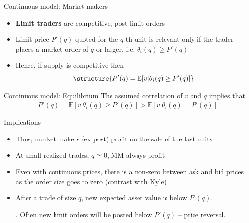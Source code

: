\documentclass[english,10pt
,aspectratio=169
]{beamer}
\begin{document}
\begin{frame}{Continuous model: Market makers}
	\begin{itemize}	
		\item \textbf{Limit traders} are competitive, post limit orders
		\item Limit price $P'(q)$ quoted for the $q$-th unit is relevant only if the trader places a market order of $q$ or larger, i.e. $\theta_i(q) \geq P'(q)$
		\item Hence, if supply is competitive then
		\[
		\structure{P'(q) = \mathbb{E}[v|\theta_i(q) \geq P'(q)]}
		\]
	\end{itemize}
\end{frame}


\begin{frame}{Continuous model: Equilibrium}
	The assumed correlation of $v$ and $q$ implies that
	\begin{align}
	P'(q) = \mathbb{E}[v|\theta_i(q) \geq P'(q)] > \mathbb{E}[v|\theta_i(q) = P'(q)]
	\end{align}
	\pause
	\begin{block}{Implications}
		\begin{itemize}
			\item Thus, market makers (ex post) profit on the sale of the last units
			\item At small realized trades, $q \simeq 0$, MM always profit
			\item Even with continuous prices, there is a non-zero  between ask and bid prices as the order size goes to zero (contrast with Kyle)
			\item After a trade of size $q$, new expected asset value is below $P'(q)$. \pause 
			
			. Often new limit orders will be posted below $P'(q)$ -- price reversal.
		\end{itemize}
	\end{block}
\end{frame}
\end{document}
